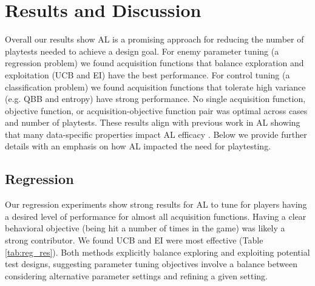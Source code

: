 \documentclass{sig-alternate}
\begin{document}




\section{Results and Discussion}

Overall our results show AL is a promising approach for reducing the number of playtests needed to achieve a design goal.
For enemy parameter tuning (a regression problem) we found acquisition functions that balance exploration and exploitation (UCB and EI) have the best performance.
For control tuning (a classification problem) we found acquisition functions that tolerate high variance (e.g. QBB and entropy) have strong performance.
No single acquisition function, objective function, or acquisition-objective function pair was optimal across cases and number of playtests.
These results align with previous work in AL showing that many data-specific properties impact AL efficacy \cite{schein2007:al-logreg-eval}.
Below we provide further details with an emphasis on how AL impacted the need for playtesting.


\subsection{Regression}

Our regression experiments show strong results for AL to tune for players having a desired level of performance for almost all acquisition functions.
Having a clear behavioral objective (being hit a number of times in the game) was likely a strong contributor.
We found UCB and EI were most effective (Table \ref{tab:reg_res}).
Both methods explicitly balance exploring and exploiting potential test designs, suggesting parameter tuning objectives involve a balance between considering alternative parameter settings and refining a given setting.
\end{document}
